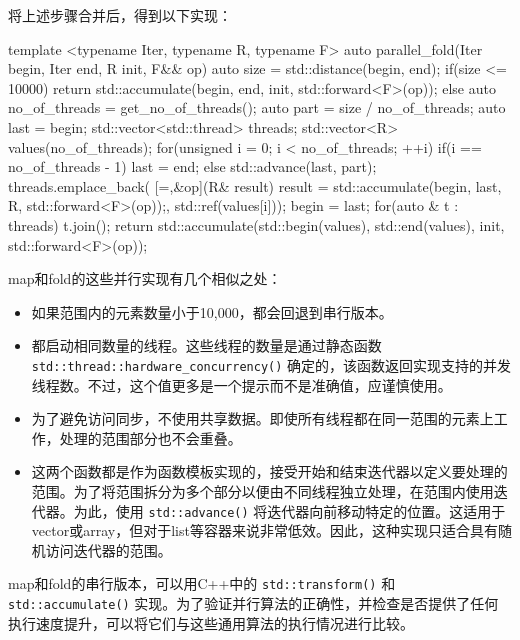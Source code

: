 将上述步骤合并后，得到以下实现：

\begin{cpp}
template <typename Iter, typename R, typename F>
auto parallel_fold(Iter begin, Iter end, R init, F&& op)
{
    auto size = std::distance(begin, end);
    if(size <= 10000)
        return std::accumulate(begin, end, init, std::forward<F>(op));
    else
    {
        auto no_of_threads = get_no_of_threads();
        auto part = size / no_of_threads;
        auto last = begin;
        std::vector<std::thread> threads;
        std::vector<R> values(no_of_threads);
        for(unsigned i = 0; i < no_of_threads; ++i)
        {
            if(i == no_of_threads - 1) last = end;
            else std::advance(last, part);
            threads.emplace_back(
                [=,&op](R& result){
                    result = std::accumulate(begin, last, R{},
                                             std::forward<F>(op));},
            std::ref(values[i]));
            begin = last;
        }
        for(auto & t : threads) t.join();
        return std::accumulate(std::begin(values), std::end(values),
                               init, std::forward<F>(op));
    }
}
\end{cpp}


map和fold的这些并行实现有几个相似之处：

\begin{itemize}
\item
如果范围内的元素数量小于10,000，都会回退到串行版本。

\item
都启动相同数量的线程。这些线程的数量是通过静态函数 \verb|std::thread::hardware_concurrency()| 确定的，该函数返回实现支持的并发线程数。不过，这个值更多是一个提示而不是准确值，应谨慎使用。

\item
为了避免访问同步，不使用共享数据。即使所有线程都在同一范围的元素上工作，处理的范围部分也不会重叠。

\item
这两个函数都是作为函数模板实现的，接受开始和结束迭代器以定义要处理的范围。为了将范围拆分为多个部分以便由不同线程独立处理，在范围内使用迭代器。为此，使用 \verb|std::advance()| 将迭代器向前移动特定的位置。这适用于vector或array，但对于list等容器来说非常低效。因此，这种实现只适合具有随机访问迭代器的范围。
\end{itemize}

map和fold的串行版本，可以用C++中的 \verb|std::transform()| 和 \verb|std::accumulate()| 实现。为了验证并行算法的正确性，并检查是否提供了任何执行速度提升，可以将它们与这些通用算法的执行情况进行比较。

